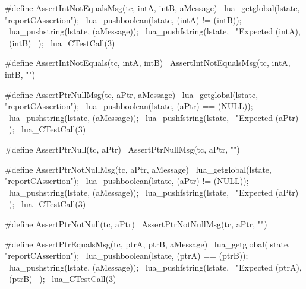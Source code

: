 \stopTestSuite

\startTestSuite[assertIntNotEquals]

\startCHeader
#define AssertIntNotEqualsMsg(tc, intA, intB, aMessage) \
  lua_getglobal(lstate, "reportCAssertion");            \
  lua_pushboolean(lstate, (intA) != (intB));            \
  lua_pushstring(lstate, (aMessage));                   \
  lua_pushfstring(lstate,                               \
      "Expected %
      (intA),                                           \
      (intB)                                            \
    );                                                  \
  lua_CTestCall(3)

#define AssertIntNotEquals(tc, intA, intB) \
  AssertIntNotEqualsMsg(tc, intA, intB, "")
\stopCHeader

\stopTestSuite

\startTestSuite[assertPrtNull]

\startCHeader
#define AssertPtrNullMsg(tc, aPtr, aMessage) \
  lua_getglobal(lstate, "reportCAssertion"); \
  lua_pushboolean(lstate, (aPtr) == (NULL)); \
  lua_pushstring(lstate, (aMessage));        \
  lua_pushfstring(lstate,                    \
      "Expected %
      (aPtr)                                 \
    );                                       \
  lua_CTestCall(3)

#define AssertPtrNull(tc, aPtr) \
  AssertPtrNullMsg(tc, aPtr, "")
\stopCHeader

\stopTestSuite

\startTestSuite[assertPtrNotNull]

\startCHeader
#define AssertPtrNotNullMsg(tc, aPtr, aMessage) \
  lua_getglobal(lstate, "reportCAssertion");    \
  lua_pushboolean(lstate, (aPtr) != (NULL));    \
  lua_pushstring(lstate, (aMessage));           \
  lua_pushfstring(lstate,                       \
      "Expected %
      (aPtr)                                    \
    );                                          \
  lua_CTestCall(3)

#define AssertPtrNotNull(tc, aPtr) \
  AssertPtrNotNullMsg(tc, aPtr, "")
\stopCHeader

\stopTestSuite

\startTestSuite[assertPtrEquals]

\startCHeader
#define AssertPtrEqualsMsg(tc, ptrA, ptrB, aMessage) \
  lua_getglobal(lstate, "reportCAssertion");         \
  lua_pushboolean(lstate, (ptrA) == (ptrB));         \
  lua_pushstring(lstate, (aMessage));                \
  lua_pushfstring(lstate,                            \
      "Expected %
      (ptrA),                                        \
      (ptrB)                                         \
    );                                               \
  lua_CTestCall(3)

